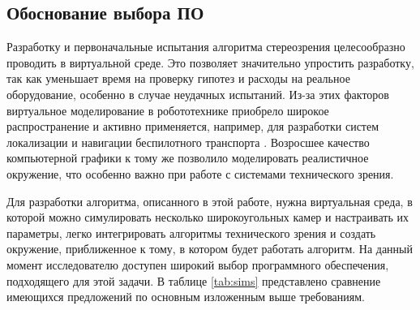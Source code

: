 \subsection{Обоснование выбора ПО}
\label{sec:software}
Разработку и первоначальные испытания алгоритма стереозрения целесообразно проводить в виртуальной среде. Это позволяет значительно упростить разработку, 
так как уменьшает время на проверку гипотез и расходы на реальное оборудование, особенно в случае неудачных испытаний. Из-за этих факторов виртуальное моделирование 
в робототехнике приобрело широкое распространение и активно применяется, например, для разработки систем локализации и навигации беспилотного транспорта \cite{}. 
Возросшее качество компьютерной графики к тому же позволило моделировать реалистичное окружение, что особенно важно при работе с системами технического зрения. 

Для разработки алгоритма, описанного в этой работе, нужна виртуальная среда, в которой можно симулировать несколько широкоугольных камер и настраивать их параметры, 
легко интегрировать алгоритмы технического зрения и создать окружение, приближенное к тому, в котором будет работать алгоритм. На данный момент исследователю доступен 
широкий выбор программного обеспечения, подходящего для этой задачи. В таблице \ref{tab:sims} представлено сравнение имеющихся предложений по основным изложенным выше 
требованиям.

